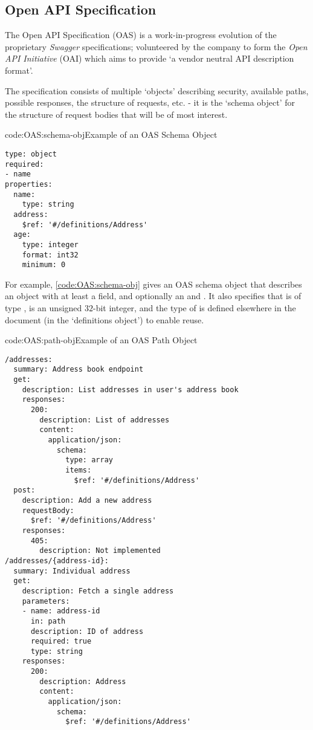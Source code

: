 \subsection{Open API Specification} \label{bg:OAS}

The Open API Specification (OAS) is a work-in-progress evolution of the proprietary \emph{Swagger} specifications; volunteered by the company to form the \emph{Open API Initiative} (OAI) which aims to provide `a vendor neutral API description format'. \cite{about_oai}

The specification consists of multiple `objects' describing security, available paths, possible responses, the structure of requests, etc. - it is the `schema object' for the structure of request bodies that will be of most interest.

\begin{codelisting}{code:OAS:schema-obj}{Example of an OAS Schema Object}
\begin{spacing}{\codespacing}
\begin{verbatim}
type: object
required:
- name
properties:
  name:
    type: string
  address:
    $ref: '#/definitions/Address'
  age:
    type: integer
    format: int32
    minimum: 0
\end{verbatim}
\end{spacing}
\end{codelisting}

For example, \cref{code:OAS:schema-obj} gives an OAS schema object that describes an object with at least a  field, and optionally an  and . It also specifies that  is of type ,  is an unsigned $32$-bit integer, and the type of  is defined elsewhere in the document (in the `definitions object') to enable reuse.

\begin{codelisting}{code:OAS:path-obj}{Example of an OAS Path Object}
\begin{spacing}{\codespacing}
\begin{verbatim}
/addresses:
  summary: Address book endpoint
  get:
    description: List addresses in user's address book
    responses:
      200:
        description: List of addresses
        content:
          application/json:
            schema:
              type: array
              items:
                $ref: '#/definitions/Address' 
  post:
    description: Add a new address
    requestBody:
      $ref: '#/definitions/Address'
    responses:
      405:
        description: Not implemented
/addresses/{address-id}:
  summary: Individual address
  get:
    description: Fetch a single address
    parameters:
    - name: address-id
      in: path
      description: ID of address
      required: true
      type: string
    responses:
      200:
        description: Address
        content:
          application/json:
            schema:
              $ref: '#/definitions/Address'
\end{verbatim}
\end{spacing}
\end{codelisting}

